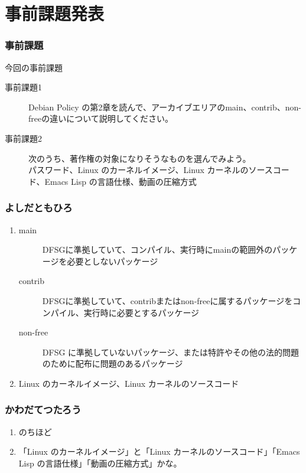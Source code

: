 \documentclass[cjk,dvipdfmx,10pt,%
hyperref={bookmarks=true,bookmarksnumbered=true,bookmarksopen=false,%
colorlinks=false,%
pdftitle={第 58 回 関西 Debian 勉強会},%
pdfauthor={倉敷・のがた・河田・佐々木},%
pdfsubject={資料},%
}]{beamer}
\begin{document}

\section{事前課題発表}


\begin{frame}[fragile]
\frametitle{事前課題}

\begin{block}{今回の事前課題}
  \begin{description}
  \item[事前課題1] Debian Policy の第2章を読んで、アーカイブエリアのmain、contrib、non-freeの違いについて説明してください。
  \item[事前課題2] 次のうち、著作権の対象になりそうなものを選んでみよう。
    \\
    パスワード、Linux のカーネルイメージ、Linux カーネルのソースコード、Emacs Lisp の言語仕様、動画の圧縮方式
  \end{description}
\end{block}

\end{frame}


\begin{frame}
\frametitle{ よしだともひろ }
  \begin{enumerate}
  \item
    \begin{description}
    \item [main] DFSGに準拠していて、コンパイル、実行時にmainの範囲外のパッケージを必要としないパッケージ
    \item [contrib] DFSGに準拠していて、contribまたはnon-freeに属するパッケージをコンパイル、実行時に必要とするパッケージ
    \item [non-free] DFSG に準拠していないパッケージ、または特許やその他の法的問題のために配布に問題のあるパッケージ
    \end{description}
  \item Linux のカーネルイメージ、Linux カーネルのソースコード
  \end{enumerate}
\end{frame}

\begin{frame}
\frametitle{ かわだてつたろう }
  \begin{enumerate}
  \item のちほど
  \item 「Linux のカーネルイメージ」と「Linux カーネルのソースコード」「Emacs Lisp の言語仕様」「動画の圧縮方式」かな。
  \end{enumerate}
\end{frame}
\end{document}
